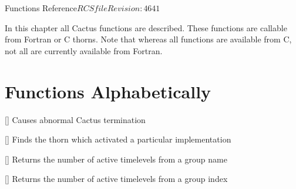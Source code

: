
\begin{cactuspart}{ Functions Reference}{$RCSfile$}{$Revision: 4641 $}
\label{part:CCTKReference}
\renewcommand{\thepage}{\Alph{part}\arabic{page}}

In this chapter all  Cactus functions are described.
These functions are callable from Fortran or C thorns.  Note that whereas
all functions are available from C, not all are currently available
from Fortran.


\chapter{Functions Alphabetically}


\begin{Lentry}

\item[\code{CCTK\_Abort}] [\pageref{CCTK-Abort}]
  Causes abnormal Cactus termination

\item[\code{CCTK\_ActivatingThorn}] [\pageref{CCTK-ActivatingThorn}]
  Finds the thorn which activated a particular implementation

\item[\code{CCTK\_ActiveTimeLevels}] [\pageref{CCTK-ActiveTimeLevels}]
  Returns the number of active timelevels from a group name

\item[\code{CCTK\_ActiveTimeLevelsGI}] [\pageref{CCTK-ActiveTimeLevels}]
  Returns the number of active timelevels from a group index


\end{Lentry}
\end{cactuspart}
